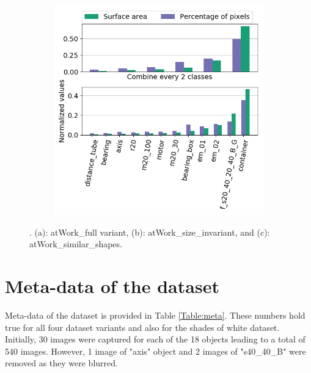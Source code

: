 \begin{figure}[h]
\begin{subfigure}{.47\textwidth}
				\includegraphics[width=1\linewidth]{images/analyzer_shape}
				\caption{}
				\label{Fig:analyzerc}
			\end{subfigure}
			\caption{. (a): atWork\_full variant, (b): atWork\_size\_invariant, and (c): atWork\_similar\_shapes.}
			\label{Fig:analyzer}
		\end{figure}
	

\section{Meta-data of the dataset}

Meta-data of the dataset is provided in Table \ref{Table:meta}. These numbers hold true for all four dataset variants and also for the shades of white dataset. Initially, 30 images were captured for each of the 18 objects leading to a total of 540 images. However, 1 image of "axis" object and 2 images of "s40\_40\_B" were removed as they were blurred.

